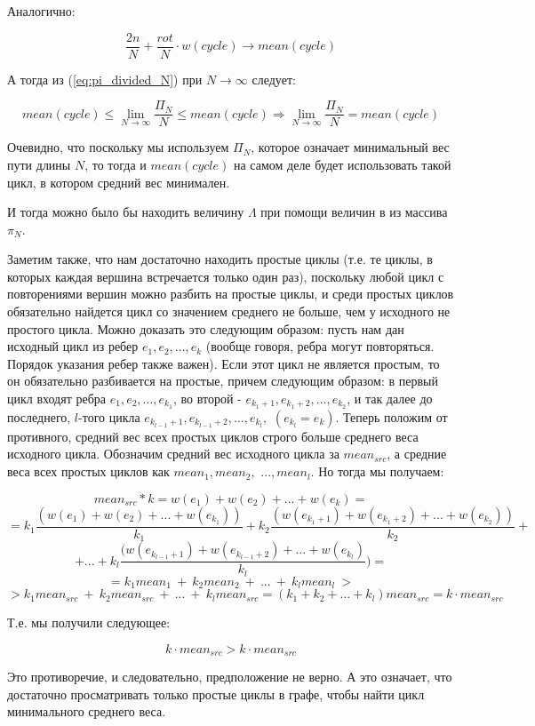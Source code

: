 \documentclass[a4paper,12pt]{extarticle}
\theoremstyle{plain} %
\begin{document}
\begin{large}
Аналогично:

$$\frac{2n}{N} + \frac{rot}{N} \cdot w(cycle) \rightarrow mean(cycle)$$

А тогда из (\ref{eq:pi_divided_N}) при $N \rightarrow \infty$ следует:

$$mean(cycle) \le \lim_{N \rightarrow \infty} \frac{\Pi_N}{N} \le mean(cycle) \Rightarrow \lim_{N \rightarrow \infty}\frac{\Pi_N}{N} = mean(cycle)$$

Очевидно, что поскольку мы используем $\Pi_N$, которое означает минимальный вес пути длины $N$, то тогда и $mean(cycle)$ на самом деле будет использовать такой цикл, в котором средний вес минимален.

И тогда можно было бы находить величину $\Lambda$ при помощи величин в из массива $\pi_N$.

Заметим также, что нам достаточно находить простые циклы (т.е. те циклы, в которых каждая вершина встречается только один раз), поскольку любой цикл с повторениями вершин можно разбить на простые циклы, и среди простых циклов обязательно найдется цикл со значением среднего не больше, чем у исходного не простого цикла. Можно доказать это следующим образом: пусть нам дан исходный цикл из ребер $e_1, e_2, ..., e_k$ (вообще говоря, ребра могут повторяться. Порядок указания ребер также важен). Если этот цикл не является простым, то он обязательно разбивается на простые, причем следующим образом: в первый цикл входят ребра $e_1, e_2, ..., e_{k_1}$, во второй - $e_{k_1+1}, e_{k_1+2}, ..., e_{k_2}$, и так далее до последнего, $l$-того цикла $e_{k_{l-1}+1}, e_{k_{l-1}+2}, ..., e_{k_l},$ $(e_{k_l} = e_k)$.  Теперь положим от противного, средний вес всех простых циклов строго больше среднего веса исходного цикла. Обозначим средний вес исходного цикла за $mean_{src}$, а средние веса всех простых циклов как $mean_1, mean_2,$ $..., mean_l$. Но тогда мы получаем:

$$mean_{src} * k = w(e_1) + w(e_2) + ... + w(e_k) =$$
$$= k_1\frac{(w(e_1) +  w(e_2) +  ... + w(e_{k_1}))}{k_1} + k_2\frac{(w(e_{k_1+1}) + w(e_{k_1+2}) + ... + w(e_{k_2}))}{k_2} +$$
$$+ ... + k_l\frac{(w(e_{k_{l-1}+1}) + w(e_{k_{l-1}+2}) + ... + w(e_{k_l})}{k_l}) = $$
$$=k_1mean_1 ~+ ~k_2mean_2 ~+ ~... ~+ ~k_lmean_l~ >$$
$$> k_1mean_{src}~ +~ k_2mean_{src}~ +~ ...~ +~ k_lmean_{src} = (k_1 + k_2 + ... + k_l)mean_{src} = k \cdot mean_{src}$$

Т.е. мы получили следующее:

$$k \cdot mean_{src} > k \cdot mean_{src}$$

Это противоречие, и следовательно, предположение не верно. А это означает, что достаточно просматривать только простые циклы в графе, чтобы найти цикл минимального среднего веса.


\end{large}
\end{document}

